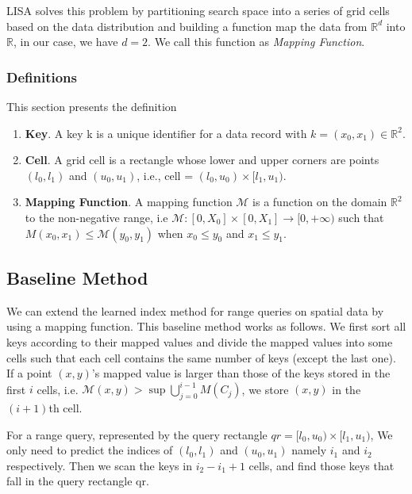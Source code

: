 LISA solves this problem by partitioning search space into a series of grid cells based on the data distribution and building a function map the data from $\mathbb{R}^d$ into $\mathbb{R}$, in our case, we have $d=2$. We call this function as \textit{Mapping Function}.
\subsubsection{Definitions}

This section presents the definition

\begin{enumerate}
	\item \textbf{Key}. A key k is a unique identifier for a data record with $k = (x_{0}, x_{1}) \in \mathbb{R}^{2}$. 
    
	\item \textbf{Cell}. A grid cell is a rectangle whose lower and upper corners are points $(l_0, l_1)$ and  $(u_0,u_1)$, i.e.,  cell = $(l_{0},u_{0}) \times [l_{1},u_{1})$.
	
	\item \textbf{Mapping Function}. A mapping function $\mathcal{M}$ is a function on the domain $\mathbb{R}^2$ to the non-negative range, i.e $\mathcal{M}:[0,X_{0}]\times [0,X_{1}]\to [0,+\infty)$ such that $M(x_0,x_{1}) \leq \mathcal{M}(y_{0},y_1)$ when $x_0 \leq y_0$ and $x_1 \leq y_1$.
\end{enumerate}

\subsection{Baseline Method}  

We can extend the learned index method for range queries on spatial data by using a mapping function. This baseline method works as follows. We first sort all keys according to their mapped values and divide the mapped values into some cells such that each cell contains the same number of keys (except the last one). If a point $(x,y)$’s mapped value is larger than those of the keys stored in the first $i$ cells, i.e. $\mathcal{M}(x,y) > \sup \bigcup\limits_{j=0}^{i-1} M(C_{j})$, we store $(x,y)$ in the $(i+1)$th cell. 

For a range query, represented by the query rectangle $qr = [l_{0},u_{0}) \times [l_{1},u_{1})$, We only need to predict the indices of $(l_{0}, l_{1})$ and $(u_{0},u_{1})$ namely $i_{1}$ and $i_{2}$ respectively. Then we scan the keys in $i_{2}-i_{1}+1$ cells, and find those keys that fall in the query rectangle qr. 

